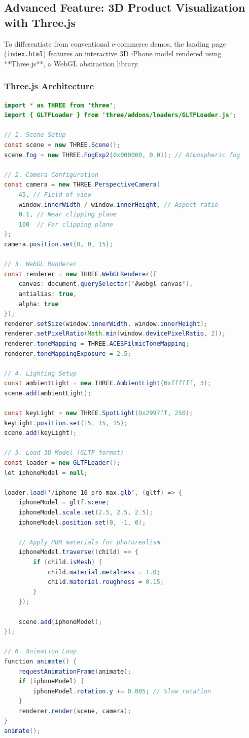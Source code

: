 \documentclass[12pt, a4paper]{report}
\begin{document}
\subsection{Advanced Feature: 3D Product Visualization with Three.js}

To differentiate from conventional e-commerce demos, the landing page (\texttt{index.html}) features an interactive 3D iPhone model rendered using **Three.js**, a WebGL abstraction library.

\subsubsection{Three.js Architecture}

\begin{lstlisting}[language=Java, caption=Three.js Scene Initialization (index.html)]
import * as THREE from 'three';
import { GLTFLoader } from 'three/addons/loaders/GLTFLoader.js';

// 1. Scene Setup
const scene = new THREE.Scene();
scene.fog = new THREE.FogExp2(0x000000, 0.01); // Atmospheric fog

// 2. Camera Configuration
const camera = new THREE.PerspectiveCamera(
    45, // Field of view
    window.innerWidth / window.innerHeight, // Aspect ratio
    0.1, // Near clipping plane
    100  // Far clipping plane
);
camera.position.set(0, 0, 15);

// 3. WebGL Renderer
const renderer = new THREE.WebGLRenderer({ 
    canvas: document.querySelector('#webgl-canvas'), 
    antialias: true, 
    alpha: true 
});
renderer.setSize(window.innerWidth, window.innerHeight);
renderer.setPixelRatio(Math.min(window.devicePixelRatio, 2));
renderer.toneMapping = THREE.ACESFilmicToneMapping;
renderer.toneMappingExposure = 2.5;

// 4. Lighting Setup
const ambientLight = new THREE.AmbientLight(0xffffff, 3);
scene.add(ambientLight);

const keyLight = new THREE.SpotLight(0x2997ff, 250);
keyLight.position.set(15, 15, 15);
scene.add(keyLight);

// 5. Load 3D Model (GLTF format)
const loader = new GLTFLoader();
let iphoneModel = null;

loader.load('/iphone_16_pro_max.glb', (gltf) => {
    iphoneModel = gltf.scene;
    iphoneModel.scale.set(2.5, 2.5, 2.5);
    iphoneModel.position.set(0, -1, 0);
    
    // Apply PBR materials for photorealism
    iphoneModel.traverse((child) => {
        if (child.isMesh) {
            child.material.metalness = 1.0;
            child.material.roughness = 0.15;
        }
    });
    
    scene.add(iphoneModel);
});

// 6. Animation Loop
function animate() {
    requestAnimationFrame(animate);
    if (iphoneModel) {
        iphoneModel.rotation.y += 0.005; // Slow rotation
    }
    renderer.render(scene, camera);
}
animate();
\end{lstlisting}
\end{document}
